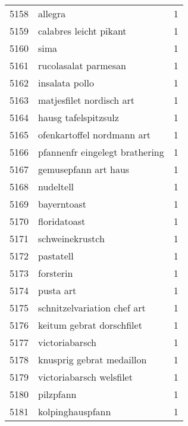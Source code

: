 \begin{tabular}{llr}
5158 &                                            allegra &      1 \\
5159 &                             calabres leicht pikant &      1 \\
5160 &                                               sima &      1 \\
5161 &                               rucolasalat parmesan &      1 \\
5162 &                                     insalata pollo &      1 \\
5163 &                           matjesfilet nordisch art &      1 \\
5164 &                               hausg tafelspitzsulz &      1 \\
5165 &                         ofenkartoffel nordmann art &      1 \\
5166 &                     pfannenfr eingelegt brathering &      1 \\
5167 &                               gemusepfann art haus &      1 \\
5168 &                                          nudeltell &      1 \\
5169 &                                        bayerntoast &      1 \\
5170 &                                       floridatoast &      1 \\
5171 &                                    schweinekrustch &      1 \\
5172 &                                          pastatell &      1 \\
5173 &                                          forsterin &      1 \\
5174 &                                          pusta art &      1 \\
5175 &                        schnitzelvariation chef art &      1 \\
5176 &                          keitum gebrat dorschfilet &      1 \\
5177 &                                     victoriabarsch &      1 \\
5178 &                          knusprig gebrat medaillon &      1 \\
5179 &                           victoriabarsch welsfilet &      1 \\
5180 &                                          pilzpfann &      1 \\
5181 &                                   kolpinghauspfann &      1 \\

\end{tabular}
